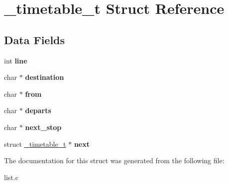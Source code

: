 \hypertarget{struct__timetable__t}{}\section{\+\_\+timetable\+\_\+t Struct Reference}
\label{struct__timetable__t}
\subsection*{Data Fields}
\begin{DoxyCompactItemize}
\item 
\hypertarget{struct__timetable__t_a1bafc9a0722f2aefddadc94467347cde}{}int {\bfseries line}\label{struct__timetable__t_a1bafc9a0722f2aefddadc94467347cde}

\item 
\hypertarget{struct__timetable__t_a7c783e14de0c40e1ac2b499fdbda88fd}{}char $\ast$ {\bfseries destination}\label{struct__timetable__t_a7c783e14de0c40e1ac2b499fdbda88fd}

\item 
\hypertarget{struct__timetable__t_a9d61c29d3f2d6804f53b33543a60a795}{}char $\ast$ {\bfseries from}\label{struct__timetable__t_a9d61c29d3f2d6804f53b33543a60a795}

\item 
\hypertarget{struct__timetable__t_a30dc74e3be1a2b364d408337ff9115ad}{}char $\ast$ {\bfseries departs}\label{struct__timetable__t_a30dc74e3be1a2b364d408337ff9115ad}

\item 
\hypertarget{struct__timetable__t_ace4d0bdc882c1f739dd8f8eef7718bba}{}char $\ast$ {\bfseries next\+\_\+stop}\label{struct__timetable__t_ace4d0bdc882c1f739dd8f8eef7718bba}

\item 
\hypertarget{struct__timetable__t_a1c49830312d2d5cc9015faf8ff846239}{}struct \hyperlink{struct__timetable__t}{\+\_\+timetable\+\_\+t} $\ast$ {\bfseries next}\label{struct__timetable__t_a1c49830312d2d5cc9015faf8ff846239}

\end{DoxyCompactItemize}


The documentation for this struct was generated from the following file\+:\begin{DoxyCompactItemize}
\item 
list.\+c\end{DoxyCompactItemize}
